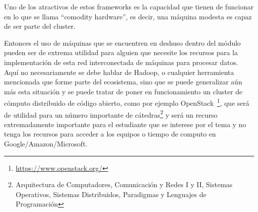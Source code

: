 Uno de los atractivos de estos \glspl{framework} es la capacidad que tienen de
funcionar en lo que se llama ``comodity hardware'', es decir, una máquina
modesta es capaz de ser parte del \gls{cluster}. 

Entonces el uso de máquinas
que se encuentren en deshuso dentro del módulo pueden ser de extrema utilidad
para alguien que necesite los recursos para la implementación de esta red
interconectada de máquinas para procesar datos. Aquí no necesariamente se debe
hablar de Hadoop, o cualquier herramienta mencionada que forme parte del
ecosistema, sino que se puede generalizar aún más esta situación y se puede
tratar de poner
en funcionamiento un \gls{cluster} de cómputo distribuido de código abierto,
como por ejemplo OpenStack~\footnote{\url{https://www.openstack.org/}}, que
será de utilidad para un número importante de cátedras\footnote{Arquitectura de
Computadores, Comunicación y Redes I y II, Sistemas Operativos, Sistemas
Distribuidos, Paradigmas y Lenguajes de Programación} y será un recurso
extremadamente importante para el estudiante que se interese por el tema y no
tenga los recursos para acceder a los equipos o tiempo de computo en
Google/Amazon/Microsoft.
